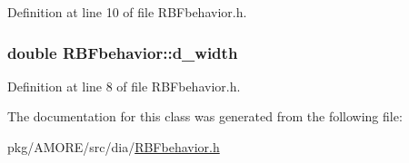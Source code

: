 Definition at line 10 of file RBFbehavior.h.

\hypertarget{class_r_b_fbehavior_a6b37a2973f5e8390e37333e81de26077}{
\subsubsection[{d\_\-width}]{\setlength{\rightskip}{0pt plus 5cm}double {\bf RBFbehavior::d\_\-width}}}
\label{class_r_b_fbehavior_a6b37a2973f5e8390e37333e81de26077}


Definition at line 8 of file RBFbehavior.h.



The documentation for this class was generated from the following file:\begin{DoxyCompactItemize}
\item 
pkg/AMORE/src/dia/\hyperlink{_r_b_fbehavior_8h}{RBFbehavior.h}\end{DoxyCompactItemize}
